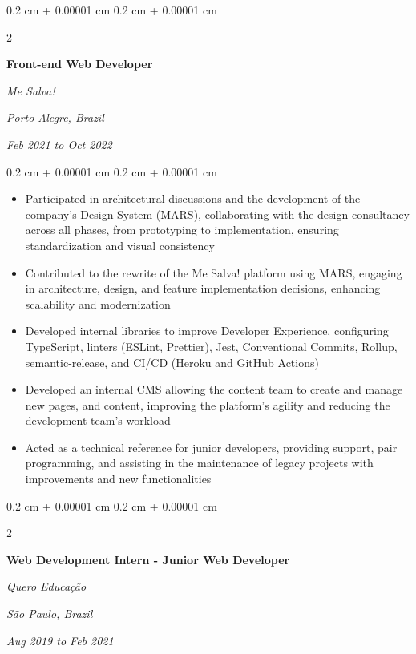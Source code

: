 \documentclass[10pt, a4paper]{article}
\newenvironment{highlights}{
    \begin{itemize}[
        topsep=0.10 cm,
        parsep=0.10 cm,
        partopsep=0pt,
        itemsep=0pt,
        leftmargin=0.4 cm + 10pt
    ]
}{
    \end{itemize}
} %
\newenvironment{onecolentry}{
    \begin{adjustwidth}{
        0.2 cm + 0.00001 cm
    }{
        0.2 cm + 0.00001 cm
    }
}{
    \end{adjustwidth}
} %
\newenvironment{twocolentry}[2][]{
    \onecolentry
    \def\secondColumn{#2}
    \setcolumnwidth{\fill, 7 cm}
    \begin{paracol}{2}
}{
    \switchcolumn \raggedleft \secondColumn
    \end{paracol}
    \endonecolentry
} %
\begin{document}
        \vspace{0.2 cm}

        \begin{twocolentry}{
        \textit{Porto Alegre, Brazil}    
            
        \textit{Feb 2021 to Oct 2022}}
            \textbf{Front-end Web Developer}
            
            \textit{Me Salva!}
        \end{twocolentry}

        \vspace{0.10 cm}
        \begin{onecolentry}
            \begin{highlights}
                \item Participated in architectural discussions and the development of the company's Design System (MARS), collaborating with the design consultancy across all phases, from prototyping to implementation, ensuring standardization and visual consistency
                \item Contributed to the rewrite of the Me Salva! platform using MARS, engaging in architecture, design, and feature implementation decisions, enhancing scalability and modernization
                \item Developed internal libraries to improve Developer Experience, configuring TypeScript, linters (ESLint, Prettier), Jest, Conventional Commits, Rollup, semantic-release, and CI/CD (Heroku and GitHub Actions)
                \item Developed an internal CMS allowing the content team to create and manage new pages, and content, improving the platform's agility and reducing the development team's workload
                \item Acted as a technical reference for junior developers, providing support, pair programming, and assisting in the maintenance of legacy projects with improvements and new functionalities
            \end{highlights}
        \end{onecolentry}


        \vspace{0.2 cm}

        \begin{twocolentry}{
        \textit{São Paulo, Brazil}    
            
        \textit{Aug 2019 to Feb 2021}}
            \textbf{Web Development Intern - Junior Web Developer}
            
            \textit{Quero Educação}
        \end{twocolentry}
\end{document}
